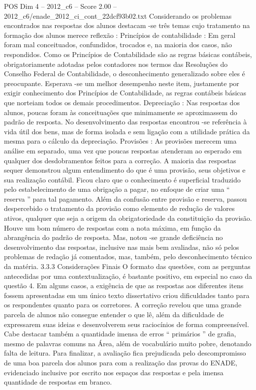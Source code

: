 \begin{textsample}{POS Dim 4 – 2012\_c6 – Score 2.00 – 2012\_c6/enade\_2012\_ci\_cont\_22dcf93b02.txt}
Considerando os problemas encontrados nas respostas dos alunos destacam -se três temas cujo tratamento na formação dos alunos merece reflexão : Princípios de contabilidade : Em geral foram mal conceituados, confundidos, trocados e, na maioria dos casos, não respondidos.
Como os Princípios de Contabilidade são as regras básicas contábeis, obrigatoriamente adotadas pelos contadores nos termos das Resoluções do Conselho Federal de Contabilidade, o desconhecimento generalizado sobre eles é preocupante.
Esperava -se um melhor desempenho neste item, justamente por exigir conhecimento dos Princípios de Contabilidade, as regras contábeis básicas que norteiam todos os demais procedimentos.
Depreciação : Nas respostas dos alunos, poucas foram às conceituações que minimamente se aproximassem do padrão de resposta.
No desenvolvimento das respostas encontrou -se referência à vida útil dos bens, mas de forma isolada e sem ligação com a utilidade prática da mesma para o cálculo da depreciação.
Provisões : As provisões merecem uma análise em separado, uma vez que poucas respostas atenderam ao esperado em qualquer dos desdobramentos feitos para a correção.
A maioria das respostas sequer demonstrou algum entendimento do que é uma provisão, seus objetivos e sua realização contábil.
Ficou claro que o conhecimento é superficial traduzido pelo estabelecimento de uma obrigação a pagar, no enfoque de criar uma “ reserva ” para tal pagamento.
Além da confusão entre provisão e reserva, passou despercebido o tratamento da provisão como elemento de redução de valores ativos, qualquer que seja a origem da obrigatoriedade da constituição da provisão.
Houve um bom número de respostas com a nota máxima, em função da abrangência do padrão de resposta.
Mas, notou -se grande deficiência no desenvolvimento das respostas, inclusive nas mais bem avaliadas, não só pelos problemas de redação já comentados, mas, também, pelo desconhecimento técnico da matéria. 3.3.3 Considerações Finais O formato das questões, com as perguntas antecedidas por uma contextualização, é bastante positivo, em especial no caso da questão 4.
Em alguns casos, a exigência de que as respostas aos diferentes itens fossem apresentadas em um único texto dissertativo criou dificuldades tanto para os respondentes quanto para os corretores.
A correção revelou que uma grande parcela de alunos não consegue entender o que lê, além da dificuldade de expressarem suas ideias e desenvolverem seus raciocínios de forma compreensível.
Cabe destacar também a quantidade imensa de erros “ primários ” de grafia, mesmo de palavras comuns na Área, além de vocabulário muito pobre, denotando falta de leitura.
Para finalizar, a avaliação fica prejudicada pelo descompromisso de uma boa parcela dos alunos para com a realização das provas do ENADE, evidenciado inclusive por escrito nos espaços das respostas e pela imensa quantidade de respostas em branco.

\end{textsample}
